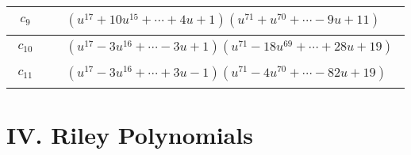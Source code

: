 \documentclass[1p]{elsarticle_modified}
\theoremstyle{definition}
\begin{document}
\begin{tabular}{m{50pt}|m{274pt}}
\hline $$\begin{aligned}c_{9}\end{aligned}$$&$\begin{aligned}
&(u^{17}+10 u^{15}+\cdots+4 u+1)(u^{71}+u^{70}+\cdots-9 u+11)
\end{aligned}$\\
\hline $$\begin{aligned}c_{10}\end{aligned}$$&$\begin{aligned}
&(u^{17}-3 u^{16}+\cdots-3 u+1)(u^{71}-18 u^{69}+\cdots+28 u+19)
\end{aligned}$\\
\hline $$\begin{aligned}c_{11}\end{aligned}$$&$\begin{aligned}
&(u^{17}-3 u^{16}+\cdots+3 u-1)(u^{71}-4 u^{70}+\cdots-82 u+19)
\end{aligned}$\\
\hline
\end{tabular}\newpage\renewcommand{\arraystretch}{1}
\centering \section*{ IV. Riley Polynomials}
\end{document}
